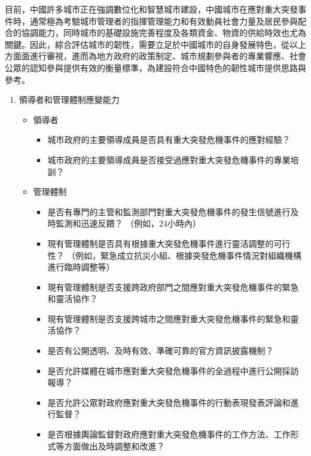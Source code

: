 \documentclass[a4paper,12pt]{article}
\begin{document}
\begin{enumerate}
\begin{enumerate}
目前，中國許多城市正在強調數位化和智慧城市建設，中國城市在應對重大突發事件時，通常極為考驗城市管理者的指揮管理能力和有效動員社會力量及居民參與配合的協調能力，同時城市的基礎設施完善程度及各類資金、物資的供給時效也尤為關鍵。因此，綜合評估城市的韌性，需要立足於中國城市的自身發展特色，從以上方面面進行審視，進而為地方政府的政策制定、城市規劃參與者的專業響應、社會公眾的認知參與提供有效的衡量標準，為建設符合中國特色的韌性城市提供思路與參考。\\
\begin{enumerate}
\item 領導者和管理體制應變能力
\label{sec:orge161ecf}
\begin{itemize}
\item 領導者
\label{sec:org4457d77}
\begin{itemize}
\item 城市政府的主要領導成員是否具有重大突發危機事件的應對經驗？\\
\item 城市政府的主要領導成員是否接受過應對重大突發危機事件的專業培訓？\\
\end{itemize}
\item 管理體制
\label{sec:orgef86448}
\begin{itemize}
\item 是否有專門的主管和監測部門對重大突發危機事件的發生信號進行及時監測和迅速反饋？  （例如，24小時內）\\
\item 現有管理體制是否具有根據重大突發危機事件進行靈活調整的可行性？  （例如，緊急成立抗災小組、根據突發危機事件情況對組織機構進行臨時調整等）\\
\item 現有管理體制是否支援跨政府部門之間應對重大突發危機事件的緊急和靈活協作？\\
\item 現有管理體制是否支援跨城市之間應對重大突發危機事件的緊急和靈活協作？\\
\item 是否有公開透明、及時有效、準確可靠的官方資訊披露機制？\\
\item 是否允許媒體在城市應對重大突發危機事件的全過程中進行公開採訪報導？\\
\item 是否允許公眾對政府應對重大突發危機事件的行動表現發表評論和進行監督？\\
\item 是否根據輿論監督對政府應對重大突發危機事件的工作方法、工作形式等方面做出及時調整和改進？\\

\end{itemize}
\end{itemize}
\end{enumerate}
\end{enumerate}
\end{enumerate}
\end{document}
